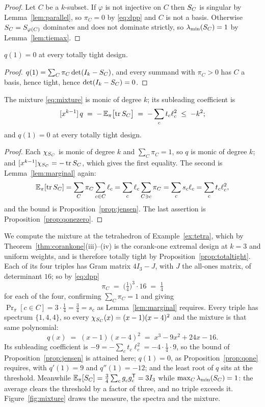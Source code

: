 \begin{proof}
Let $C$ be a $k$-subset.  If $\varphi$ is not injective on $C$ then $S_{C}$
is singular by Lemma~\ref{lem:parallel}, so $\pi_C=0$ by \eqref{eq:dpp}
and $C$ is not a basis.  Otherwise $S_{C}=S_{\varphi(C)}$ dominates and does
not dominate strictly, so $\lambda_{\min}(S_{C})=1$ by Lemma~\ref{lem:tiemax}.
\end{proof}

\begin{proposition}[Lean]\label{prop:qonezero}
$q(1)=0$ at every totally tight design.
\end{proposition}

\begin{proof}
$q(1)=\sum_C\pi_C\det(I_k-S_{C})$, and every summand with $\pi_C>0$ has $C$
a basis, hence tight, hence $\det(I_k-S_{C})=0$.
\end{proof}

\begin{proposition}\label{prop:qone}
The mixture \eqref{eq:mixture} is monic of degree $k$; its subleading
coefficient is
\[
  [x^{k-1}]\,q\;=\;-\,\mathbb{E}_\pi\bigl[\operatorname{tr}S_{C}\bigr]
  \;=\;-\sum_c t_c\ell_c^{2}\;\le\;-k^{2};
\]
and $q(1)=0$ at every totally tight design.
\end{proposition}

\begin{proof}
Each $\chi_{S_{C}}$ is monic of degree $k$ and $\sum_C\pi_C=1$, so $q$ is
monic of degree $k$; and $[x^{k-1}]\chi_{S_{C}}=-\operatorname{tr}S_{C}$, which gives the
first equality.  The second is Lemma~\ref{lem:marginal} again:
\[
  \mathbb{E}_\pi[\operatorname{tr}S_{C}]=\sum_C\pi_C\sum_{c\in C}\ell_c
  =\sum_c\ell_c\sum_{C\ni c}\pi_C=\sum_cs_c\ell_c=\sum_ct_c\ell_c^{2},
\]
and the bound is Proposition~\ref{prop:jensen}.  The last assertion is
Proposition~\ref{prop:qonezero}.
\end{proof}

We compute the mixture at the tetrahedron of Example~\ref{ex:tetra},
which by Theorem~\ref{thm:corankone}(iii)--(iv) is the corank-one extremal design at
$k=3$ and uniform weights, and is therefore totally tight by
Proposition~\ref{prop:totaltight}.  Each of its four triples has Gram
matrix $4I_3-J$, with $J$ the all-ones matrix, of determinant $16$; so by
\eqref{eq:dpp}
\[
  \pi_C\;=\;\bigl(\tfrac14\bigr)^{3}\cdot16\;=\;\tfrac14
\]
for each of the four, confirming $\sum_C\pi_C=1$ and giving
$\Pr_\pi[c\in C]=3\cdot\tfrac14=\tfrac34=s_c$ as
Lemma~\ref{lem:marginal} requires.  Every triple has spectrum $\{1,4,4\}$,
so every $\chi_{S_{C}}(x)=(x-1)(x-4)^{2}$ and the mixture is that same
polynomial:
\[
  q(x)\;=\;(x-1)(x-4)^{2}\;=\;x^{3}-9x^{2}+24x-16 .
\]
Its subleading coefficient is
$-9=-\sum_ct_c\ell_c^{2}=-4\cdot\tfrac14\cdot9$, so the bound of
Proposition~\ref{prop:jensen} is attained here; $q(1)=0$, as
Proposition~\ref{prop:qone} requires, with $q'(1)=9$ and $q''(1)=-12$; and
the least root of $q$ sits at the threshold.  Meanwhile
$\E_\pi[\SC]=\tfrac34\sum_cg_c^{\vphantom{\mathsf{T}}}g_c\tp=3I_3$ while
$\max_C\lambda_{\min}(S_{C})=1$: the average clears the threshold by a factor of
three, and no triple exceeds it.  Figure~\ref{fig:mixture} draws the measure,
the spectra and the mixture.

